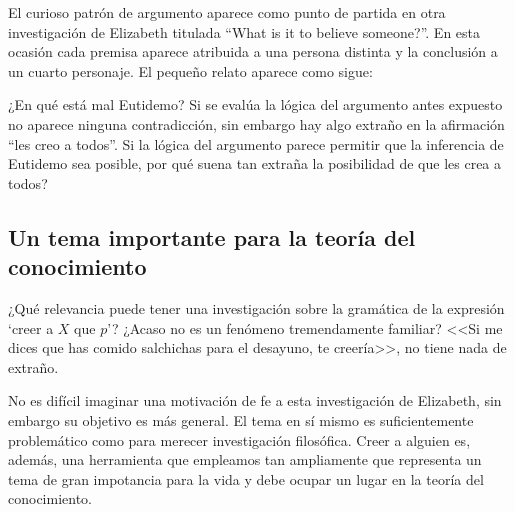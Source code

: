 El curioso patrón de argumento aparece como punto de partida en otra
investigación de Elizabeth titulada ``What is it to believe someone?''. En esta
ocasión cada premisa aparece atribuida a una persona distinta y la conclusión a
un cuarto personaje. El pequeño relato aparece como sigue: 

  ¿En qué está mal Eutidemo? Si se evalúa la lógica del argumento antes expuesto
  no aparece ninguna contradicción, sin embargo hay algo extraño en la afirmación
  ``les creo a todos''. Si la lógica del argumento parece permitir que la
  inferencia de Eutidemo sea posible, por qué suena tan extraña la posibilidad de
  que les crea a todos?

\subsection{Un tema importante para la teoría del conocimiento}
¿Qué relevancia puede tener una investigación sobre la gramática de la expresión
`creer a $X$ que $p$'? ¿Acaso no es un fenómeno tremendamente familiar? <<Si me
dices que has comido salchichas para el desayuno, te
creería>>\autocite[1]{anscombe2008faith:tobelieve}, no tiene nada de extraño.

No es difícil imaginar una motivación de fe a esta investigación de Elizabeth,
sin embargo su objetivo es más general. El tema en sí mismo es suficientemente
problemático como para merecer investigación filosófica. Creer a alguien es,
además, una herramienta que empleamos tan ampliamente que representa un tema de
gran impotancia para la vida y debe ocupar un lugar en la teoría del
conocimiento.

